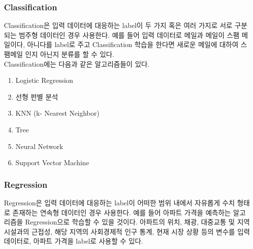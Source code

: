     \subsubsection*{Classification}
    Classification은 입력 데이터에 대응하는 label이 두 가지 혹은 여러 가지로 서로 구분되는 범주형 데이터인 경우 사용한다. 예를 들어 입력 데이터로 메일과 메일이 스팸 메일이다, 아니다를 label로 주고 Classification 학습을 한다면 새로운 메일에 대하여 스팸메일 인지 아닌지 분류를 할 수 있다. \\ Classification에는 다음과 같은 알고리즘들이 있다.
    \begin{enumerate}
        \item Logistic Regression
        \item 선형 펀별 분석
        \item KNN (k- Nearest Neighbor)
        \item Tree 
        \item Neural Network
        \item Support Vector Machine 
    \end{enumerate}
    
    \subsubsection*{Regression}
    Regression은 입력 데이터에 대응하는 label이 어떠한 범위 내에서 자유롭게 수치 형태로 존재하는 연속형 데이터인 경우 사용한다. 예를 들어 아파트 가격을 예측하는 알고리즘을 Regression으로 학습할 수 있을 것이다. 아파트의 위치, 채광, 대중교통 및 지역 시설과의 근접성, 해당 지역의 사회경제적 인구 통계, 현재 시장 상황 등의 변수를 입력 데이터로, 아파트 가격을 label로 사용할 수 있다.